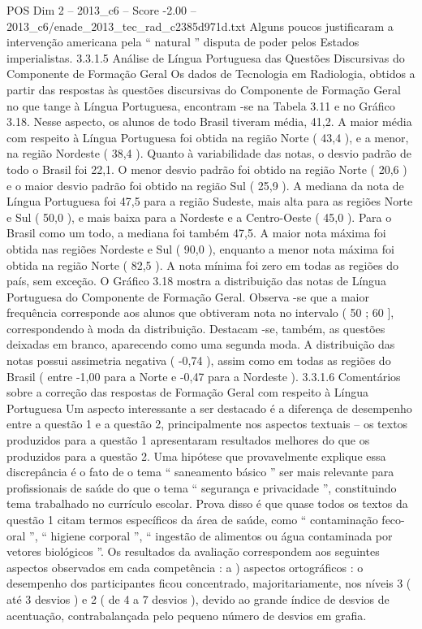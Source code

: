 \begin{textsample}{POS Dim 2 – 2013\_c6 – Score -2.00 – 2013\_c6/enade\_2013\_tec\_rad\_c2385d971d.txt}
Alguns poucos justificaram a intervenção americana pela “ natural ” disputa de poder pelos Estados imperialistas. 3.3.1.5 Análise de Língua Portuguesa das Questões Discursivas do Componente de Formação Geral Os dados de Tecnologia em Radiologia, obtidos a partir das respostas às questões discursivas do Componente de Formação Geral no que tange à Língua Portuguesa, encontram -se na Tabela 3.11 e no Gráfico 3.18.
Nesse aspecto, os alunos de todo Brasil tiveram média, 41,2.
A maior média com respeito à Língua Portuguesa foi obtida na região Norte ( 43,4 ), e a menor, na região Nordeste ( 38,4 ).
Quanto à variabilidade das notas, o desvio padrão de todo o Brasil foi 22,1.
O menor desvio padrão foi obtido na região Norte ( 20,6 ) e o maior desvio padrão foi obtido na região Sul ( 25,9 ).
A mediana da nota de Língua Portuguesa foi 47,5 para a região Sudeste, mais alta para as regiões Norte e Sul ( 50,0 ), e mais baixa para a Nordeste e a Centro-Oeste ( 45,0 ).
Para o Brasil como um todo, a mediana foi também 47,5.
A maior nota máxima foi obtida nas regiões Nordeste e Sul ( 90,0 ), enquanto a menor nota máxima foi obtida na região Norte ( 82,5 ).
A nota mínima foi zero em todas as regiões do país, sem exceção.
O Gráfico 3.18 mostra a distribuição das notas de Língua Portuguesa do Componente de Formação Geral.
Observa -se que a maior frequência corresponde aos alunos que obtiveram nota no intervalo ( 50 ; 60 ], correspondendo à moda da distribuição.
Destacam -se, também, as questões deixadas em branco, aparecendo como uma segunda moda.
A distribuição das notas possui assimetria negativa ( -0,74 ), assim como em todas as regiões do Brasil ( entre -1,00 para a Norte e -0,47 para a Nordeste ). 3.3.1.6 Comentários sobre a correção das respostas de Formação Geral com respeito à Língua Portuguesa Um aspecto interessante a ser destacado é a diferença de desempenho entre a questão 1 e a questão 2, principalmente nos aspectos textuais – os textos produzidos para a questão 1 apresentaram resultados melhores do que os produzidos para a questão 2.
Uma hipótese que provavelmente explique essa discrepância é o fato de o tema “ saneamento básico ” ser mais relevante para profissionais de saúde do que o tema “ segurança e privacidade ”, constituindo tema trabalhado no currículo escolar.
Prova disso é que quase todos os textos da questão 1 citam termos específicos da área de saúde, como “ contaminação feco-oral ”, “ higiene corporal ”, “ ingestão de alimentos ou água contaminada por vetores biológicos ”.
Os resultados da avaliação correspondem aos seguintes aspectos observados em cada competência : a ) aspectos ortográficos : o desempenho dos participantes ficou concentrado, majoritariamente, nos níveis 3 ( até 3 desvios ) e 2 ( de 4 a 7 desvios ), devido ao grande índice de desvios de acentuação, contrabalançada pelo pequeno número de desvios em grafia.

\end{textsample}

